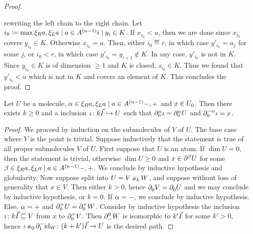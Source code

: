 \begin{proof}
\begin{center}
    \end{center}
    rewriting the left chain to the right chain.
    Let \( i_0 \eqdef \max \set{i \mid y_i \in K} \).
    If \( x_{i_0} < u \), then we are done since \( x_{i_0} \) covers \( y_{i_0} \in K \).
    Otherwise \( x_{i_0} = u \).
    Then, either \( i_0 \eqdef r \), in which case \( y'_{i_0} = u_j \) for some \( j \), or \( i_0 < r \), in which case \( y'_{i_0} = y_{i + 1} \notin K \).
    In any case, \( y'_{i_0} \) is not in \( K \).
    Since \( y_{i_0} \in K \) is of dimension \( \geq 1 \) and \( K \) is closed, \( z_{i_0} \in K \).
    Thus we found that \( y'_{i_0} < u \) which is not in \( K \) and covers an element of \( K \).
    This concludes the proof.
\end{proof}


\begin{lem} \label{lem:path_from_zero_bd_to_all_points}
    Let \( U \) be a molecule, \( \a \in \set{-, +} \) and \( x \in \gr{0}{U} \).
    Then there exists \( k \geq 0 \) and a inclusion \( \iota \colon k\arr \incl U \) such that \( \bd{0}{\a} \iota = \bd{0}{\a} U \) and \( \bd{0}{-\a} \iota = x \).
\end{lem}
\begin{proof}
    We proceed by induction on the submolecules of \( V \) of \( U \).
    The base case where \( V \) is the point is trivial.
    Suppose inductively that the statement is true of all proper submolecules \( V \) of \( U \).
    First suppose that \( U \) is an atom.
    If \( \dim U = 0 \), then the statement is trivial, otherwise \( \dim U \geq 0 \) and \( x \in \bd{}{\beta} U \) for some \( \beta \in \set{-, +} \).
    We conclude by inductive hypothesis and globularity.
    Now suppose split into \( U = V \cp{k} W \), and suppose without loss of generality that \( x \in V \).
    Then either \( k > 0 \), hence \( \bd{0}{} V = \bd{0}{} U \) and we may conclude by inductive hypothesis, or \( k = 0 \).
    If \( \a = - \), we conclude by inductive hypothesis.
    Else, \( \a = + \) and \( \bd{0}{+} U = \bd{0}{+} W \).
    Consider by inductive hypothesis the inclusion \( \iota \colon k\arr \submol V \) from \( x \) to \( \bd{0}{+} V \).
    Then \( \bd{-}{0} W \) is isomorphic to \( k'\arr \) for some \( k' > 0 \), hence \( \iota \cp{0} \bd{1}{-} \idd{W} \colon (k + k') \arr \to U \) is the desired path.
\end{proof}

